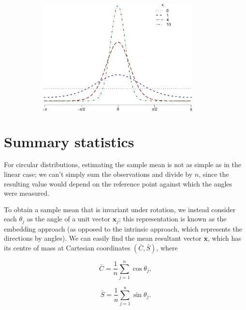 \documentclass[12pt,fleqn]{article}
\begin{document}
\begin{figure}[h!]
\begin{subfigure}[t]{0.5\textwidth}
\includegraphics[width=0.9\textwidth, keepaspectratio]{vM-linear-plot-crop.pdf}
\end{subfigure}
\end{figure}




\section{Summary statistics}

For circular distributions, estimating the sample mean is not as simple as in the linear case; we can't simply sum the observations and divide by $n$, since the resulting value would depend on the reference point against which the angles were measured.

To obtain a sample mean that is invariant under rotation, we instead consider each $\theta_j$ as the angle of a unit vector $\mathbf{x}_j$; this representation is known as the embedding approach (as opposed to the intrinsic approach, which represents the directions by angles). We can easily find the mean resultant vector $\mathbf{\bar{x}}$, which has its centre of mass at Cartesian coordinates $(\bar{C}, \bar{S})$, where

\vspace{-10pt}
\begin{minipage}{0.5\linewidth}
\[\bar{C} = \frac{1}{n} \sum_{j=1}^{n} \cos \theta_j,\]
\end{minipage}
\hspace{0.5cm}
\begin{minipage}{0.5\linewidth}
\[\bar{S} = \frac{1}{n} \sum_{j=1}^{n} \sin \theta_j.\]
\end{minipage}
\end{document}
